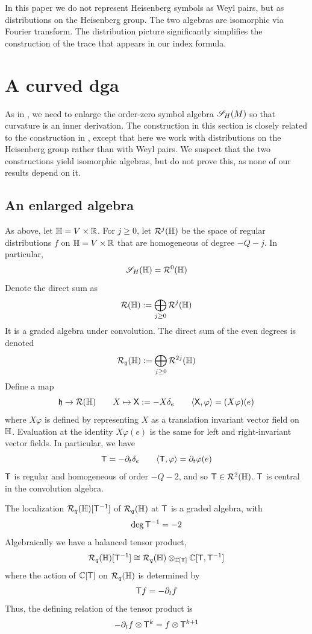 \documentclass[11pt]{amsart}
\theoremstyle{plain}
\theoremstyle{definition}
\theoremstyle{remark}
\begin{document}
In this paper we do not represent Heisenberg symbols as Weyl pairs, but as distributions on the Heisenberg group.
The two algebras are isomorphic via Fourier transform.
The distribution picture significantly simplifies the construction of the trace that appears in our index formula.









\section{A curved dga}\label{sec:enlarged-symbol-algebra}

As in \cite{GvE20}, we need to enlarge the order-zero symbol algebra ${\mathscr{S}_H}(M)$ so that curvature is an inner derivation. The construction in this section is closely related to the construction in \cite[Sections~3--5]{GvE20},
except that here we work with distributions on the Heisenberg group rather than with Weyl pairs.
We suspect that the two constructions yield isomorphic algebras, but do not prove this, as none of our results depend on it.

\subsection{An enlarged algebra}

As above, let $\mathbb{H}=V\times {\mathbb{R}}$.
For $j\geq0$, let $\mathcal{R}^j(\mathbb{H})$ be the space of regular distributions $f$
on $\mathbb{H}=V\times {\mathbb{R}}$ that are homogeneous of degree $-Q-j$.
In particular,
\[ {\mathscr{S}_H}(\mathbb{H})=\mathcal{R}^0(\mathbb{H})\]
Denote the direct sum as
\[ \mathcal{R}(\mathbb{H}):=\bigoplus_{j\ge 0} \mathcal{R}^{j}(\mathbb{H})\]
It is a graded algebra under convolution.
The direct sum of the even degrees is denoted
\[ \mathcal{R}_q(\mathbb{H}):=\bigoplus_{j\ge 0} \mathcal{R}^{2j}(\mathbb{H})\]
Define a map
\[
\mathfrak{h}\to \mathcal{R}(\mathbb{H})\qquad
 X\mapsto \mathsf X:=-X\delta_e
 \qquad
 \langle \mathsf X,\varphi\rangle=(X\varphi)(e)
\]
where $X\varphi$ is defined by representing $X$ as a translation invariant vector field on $\mathbb{H}$.
Evaluation at the identity $X\varphi(e)$ is the same for left and right-invariant vector fields.
In particular, we have
\[\mathsf{T}=-\partial_t\delta_e\qquad \langle \mathsf{T},\varphi \rangle = \partial_t\varphi(e)\]
$\mathsf{T}$ is regular and homogeneous of order $-Q-2$, and so $\mathsf{T}\in \mathcal{R}^2(\mathbb{H})$.
$\mathsf{T}$ is central in the convolution algebra.

The localization $\mathcal{R}_q(\mathbb{H})[\mathsf{T}^{-1}]$ of $\mathcal{R}_q(\mathbb{H})$ at $\mathsf{T}$ is a graded algebra,
with
\[\deg \mathsf{T}^{-1}=-2\]
Algebraically we have a balanced tensor product,
\begin{equation}\label{eq:balanced tensor product}
\mathcal{R}_q(\mathbb{H})[\mathsf{T}^{-1}]\cong \mathcal{R}_q(\mathbb{H})\otimes_{{\mathbb{C}}[\mathsf{T}]} {\mathbb{C}}[\mathsf{T}, \mathsf{T}^{-1}]
\end{equation}
where the action of ${\mathbb{C}}[\mathsf{T}]$ on $\mathcal{R}_q(\mathbb{H})$ is determined by
\[ \mathsf{T} f=-\partial_t f\]
Thus, the defining relation of the tensor product is
\[ -\partial_tf\otimes \mathsf{T}^k = f\otimes \mathsf{T}^{k+1}\]
\end{document}
